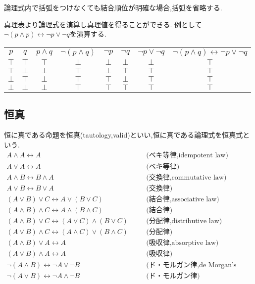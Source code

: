 論理式内で括弧をつけなくても結合順位が明確な場合,括弧を省略する.

真理表より論理式を演算し真理値を得ることができる.
例として
$\lnot (p \land p) \leftrightarrow  \lnot p \lor \lnot q$を演算する.
\begin{center}
 \begin{tabular}{|c c||c|c||c|c|c||c|}
  \hline
  $p$ & $q$ &
		  $p \land q$ & $\lnot (p \land q)$ &
				  $\lnot p$ & $\lnot q$ & $\lnot p \lor \lnot q$ &
							  $\lnot (p \land q) \leftrightarrow \lnot p \lor \lnot q$ \\
  \hhline{|==#=|=#=|=|=#=|}
  $\top$ & $\top$ & $\top$ & $\bot$ & $\bot$ & $\bot$ & $\bot$ & $\top$ \\
  \hline
  $\top$ & $\bot$ & $\bot$ & $\top$ & $\bot$ & $\top$ & $\top$ & $\top$ \\
  \hline
  $\bot$ & $\top$ & $\bot$ & $\top$ & $\top$ & $\bot$ & $\top$ & $\top$ \\
  \hline
  $\bot$ & $\bot$ & $\bot$ & $\top$ & $\top$ & $\top$ & $\top$ & $\top$ \\
  \hline
 \end{tabular}
\end{center}

\subsection{恒真}
恒に真である命題を恒真(tautology,valid)といい,恒に真である論理式を恒真式という.
\begin{align}
 A \land A \leftrightarrow A & \quad & \text{(ベキ等律,idempotent law)} \\
 A \lor A \leftrightarrow A & \quad & \text{(ベキ等律)} \\
 A \land B \leftrightarrow B \land A & \quad & \text{(交換律,commutative law)} \\
 A \lor B \leftrightarrow B \lor A & \quad & \text{(交換律)} \\
 (A \lor B) \lor C \leftrightarrow A \lor (B \lor C) & \quad & \text{(結合律,associative law)} \\
 (A \land B) \land C \leftrightarrow A \land (B \land C) & \quad & \text{(結合律)} \\
 (A \land B) \lor C \leftrightarrow (A \lor C) \land (B \lor C) & \quad & \text{(分配律,distributive law)} \\
 (A \lor B) \land C \leftrightarrow (A \land C) \lor (B \land C) & \quad & \text{(分配律)} \\
 (A \land B) \lor A \leftrightarrow A & \quad & \text{(吸収律,absorptive law)} \\
 (A \lor B) \land A \leftrightarrow A & \quad & \text{(吸収律)} \\
 \lnot (A \land B) \leftrightarrow \lnot A \lor \lnot B & \quad & \text{(ド・モルガン律,de Morgan's law)} \\
 \lnot (A \lor B) \leftrightarrow \lnot A \land \lnot B & \quad & \text{(ド・モルガン律)}
\end{align}

